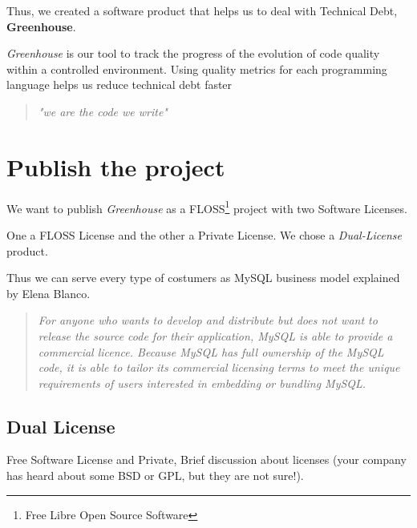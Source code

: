 \documentclass[11pt]{scrartcl}
\begin{document}
\par Thus, we created a software product that helps us to deal with Technical Debt, \textbf{Greenhouse}.

\par \emph{Greenhouse} is our tool to track the progress of the evolution of code quality within a controlled environment. Using quality metrics for each programming language helps us reduce technical debt faster

\begin{quote}
    \begin{center}
    \emph{"we are the code we write"}
    \end{center}
\end{quote}

\section{Publish the project}
\label{sec:publish-project}

\par We want to publish \emph{Greenhouse} as a FLOSS\footnote{Free Libre Open Source Software} project with two Software Licenses.

\par One a FLOSS License and the other a Private License. We chose a \emph{Dual-License} product.

\par Thus we can serve every type of costumers as MySQL business model explained by Elena Blanco\cite{dl-business-model}.

\begin{quotation}
    \emph{For anyone who wants to develop and distribute but does not want to release the source code for their application, MySQL is able to provide a commercial licence. Because MySQL has full ownership of the MySQL code, it is able to tailor its commercial licensing terms to meet the unique requirements of users interested in embedding or bundling MySQL.}
\end{quotation}

\subsection{Dual License}
\label{sub:dual-license}

\par Free Software License and Private, Brief discussion about licenses (your company has heard about some BSD or GPL, but they are not sure!).
\end{document}
